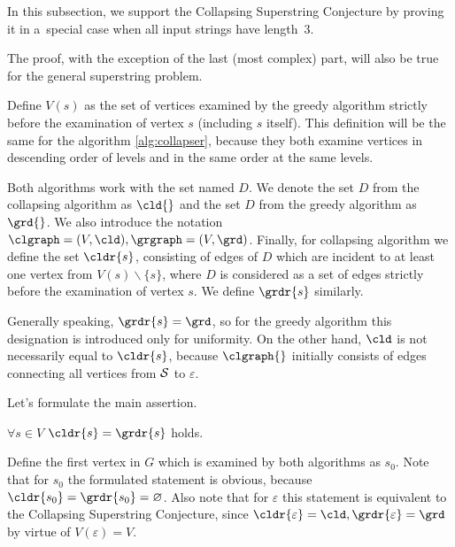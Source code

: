 In this subsection, we support the Collapsing Superstring Conjecture by proving it in a~special case when all input strings have length~3.

The proof, with the exception of the last (most complex) part, will also be true for the general superstring problem.

Define $V(s)$ as the set of vertices examined by the greedy algorithm strictly before the examination of vertex $s$ (including $s$ itself). This definition will be the same for the algorithm \ref{alg:collapser}, because they both examine vertices in descending order of levels and in the same order at the same levels.

Both algorithms work with the set named $D$. We denote the set $D$ from the collapsing algorithm as $\cld{}$ and the set $D$ from the greedy algorithm as $\grd{}$. We also introduce the notation $\clgraph = (V, \cld), \grgraph = (V, \grd)$. Finally, for collapsing algorithm we define the set $\cldr{s}$, consisting of edges of $D$ which are incident to at least one vertex from $ V (s) \backslash \{s \} $, where $D$ is considered as a set of edges strictly before the examination of vertex $s$. We define $\grdr{s}$ similarly.

\begin{remark}
Generally speaking, $\grdr{s}=\grd$, so for the greedy algorithm this designation is introduced only for uniformity. On the other hand, $\cld$ is not necessarily equal to $\cldr{s}$, because $\clgraph{}$ initially consists of edges connecting all vertices from $ {\cal S} $ to $ \varepsilon $.
\end{remark}

Let's formulate the main assertion.

\begin{statement}
    $\forall s \in V$ $\cldr{s}=\grdr{s}$ holds.
\end{statement}

Define the first vertex in $G$ which is examined by both algorithms as $s_0$. Note that for $s_0$ the formulated statement is obvious, because $\cldr{s_0} = \grdr{s_0} = \varnothing $. Also note that for $\varepsilon $ this statement is equivalent to the Collapsing Superstring Conjecture, since $\cldr{\varepsilon}=\cld, \grdr{\varepsilon}=\grd $ by virtue of $ V (\varepsilon) = V $.
